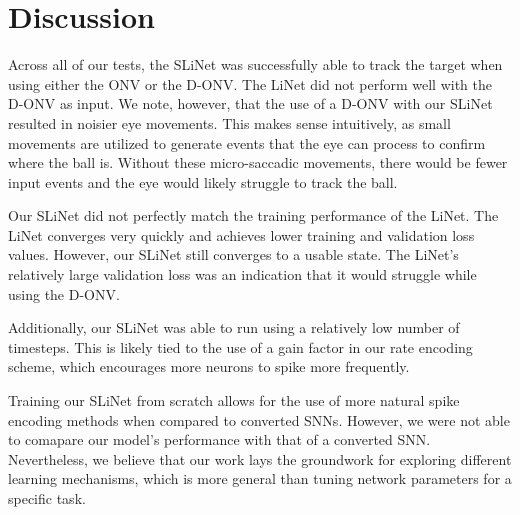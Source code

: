 \documentclass [MS] {UCLAthesis}
\begin{document}

\section{Discussion}

Across all of our tests, the SLiNet was successfully able to track the target when using either the ONV or the D-ONV. The LiNet did not perform well with the D-ONV as input. We note, however, that the use of a D-ONV with our SLiNet resulted in noisier eye movements. This makes sense intuitively, as small movements are utilized to generate events that the eye can process to confirm where the ball is. Without these micro-saccadic movements, there would be fewer input events and the eye would likely struggle to track the ball.

Our SLiNet did not perfectly match the training performance of the LiNet. The LiNet converges very quickly and achieves lower training and validation loss values. However, our SLiNet still converges to a usable state. The LiNet's relatively large validation loss was an indication that it would struggle while using the D-ONV.


Additionally, our SLiNet was able to run using a relatively low number of timesteps. This is likely tied to the use of a gain factor in our rate encoding scheme, which encourages more neurons to spike more frequently.

Training our SLiNet from scratch allows for the use of more natural spike encoding methods when compared to converted SNNs. However, we were not able to comapare our model's performance with that of a converted SNN. Nevertheless, we believe that our work lays the groundwork for exploring different learning mechanisms, which is more general than tuning network parameters for a specific task.



\end{document}
